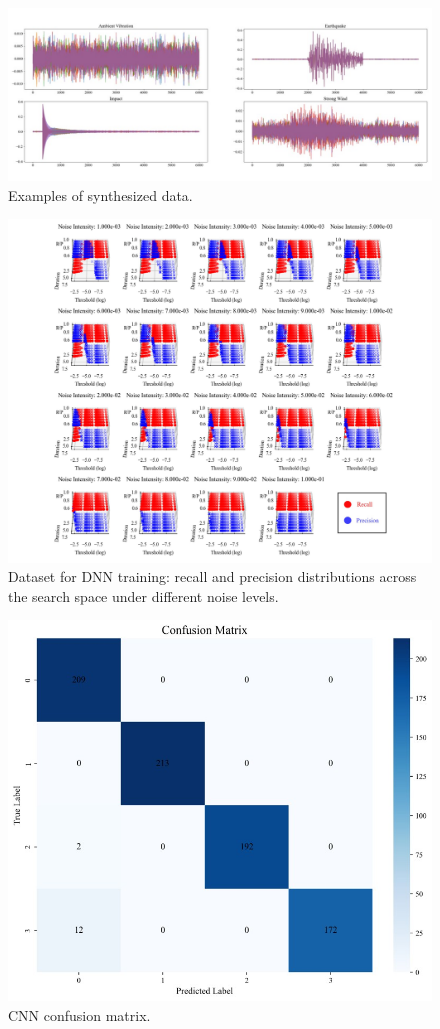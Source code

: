 \documentclass[a4paper,fleqn,numbers,sort&compress]{cas-sc}
\begin{document}
\begin{figure}[htbp]
    \centering
    \includegraphics[width=1\linewidth]{Fig11.jpg}
    \caption{Examples of synthesized data.}
    \label{fig: Synthesized Data Example}
\end{figure}

\begin{figure}[htbp]
    \centering
    \includegraphics[width=\linewidth]{Fig12.jpg}
    \caption{Dataset for DNN training: recall and precision distributions across the search space under different noise levels.}
    \label{fig: DNN Training Dataset}
\end{figure}

\begin{figure}[htbp]
    \centering
    \includegraphics[width=0.35\linewidth]{Fig13.jpg}
    \caption{CNN confusion matrix.}
    \label{fig: CNN Confusion Matrix}
\end{figure}
\end{document}
